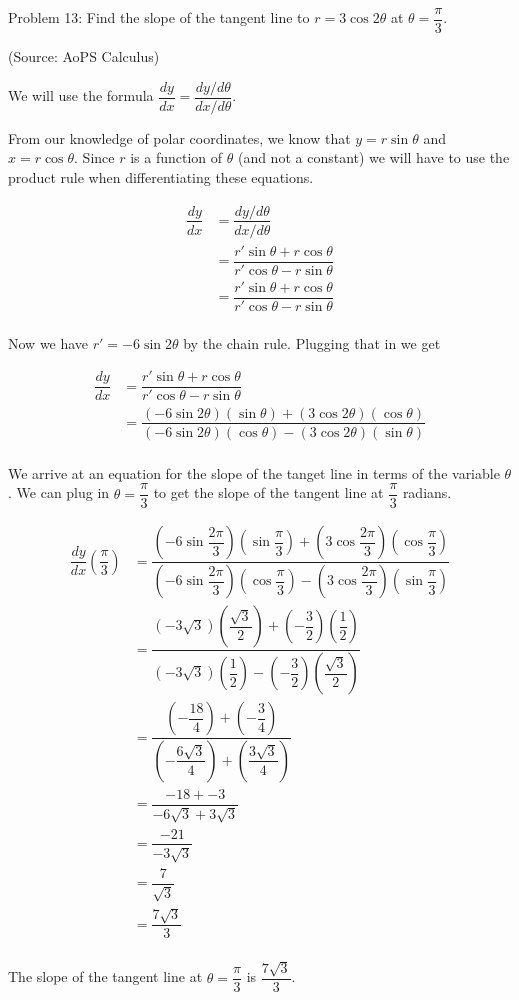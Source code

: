 Problem 13: Find the slope of the tangent line to $r = 3 \cos 2\theta$ at $\theta = \dfrac{\pi}{3}$.

(Source: AoPS Calculus)

We will use the formula $\dfrac{dy}{dx} = \dfrac{dy/d\theta}{dx/d\theta}$.

From our knowledge of polar coordinates, we know that $y = r \sin \theta$ and $x = r \cos \theta$. Since $r$ is a function of $\theta$ (and not a constant) we will have to use the product rule when differentiating these equations.

\begin{align*}
\dfrac{dy}{dx} &= \dfrac{dy/d\theta}{dx/d\theta} \\
&= \dfrac{r' \sin \theta + r \cos \theta}{r' \cos \theta - r \sin \theta} \\
&= \dfrac{r' \sin \theta + r \cos \theta}{r' \cos \theta - r \sin \theta} \\
\end{align*}

Now we have $r' = -6 \sin 2 \theta$ by the chain rule. Plugging that in we get

\begin{align*}
\dfrac{dy}{dx} &= \dfrac{r' \sin \theta + r \cos \theta}{r' \cos \theta - r \sin \theta} \\
&= \dfrac{\left(-6 \sin 2 \theta\right)\left(\sin \theta\right) + \left(3 \cos 2\theta\right)\left(\cos \theta\right)}{\left(-6 \sin 2 \theta\right)\left(\cos \theta\right) - \left(3 \cos 2\theta\right)\left(\sin \theta\right)} \\
\end{align*}

We arrive at an equation for the slope of the tanget line in terms of the variable $\theta$. We can plug in $\theta = \dfrac{\pi}{3}$ to get the slope of the tangent line at $\dfrac{\pi}{3}$ radians.

\begin{align*}
\dfrac{dy}{dx} \left(\dfrac{\pi}{3}\right) &= \dfrac{\left(-6 \sin \dfrac{2\pi}{3}\right)\left(\sin \dfrac{\pi}{3} \right) + \left(3 \cos \dfrac{2\pi}{3}\right)\left(\cos \dfrac{\pi}{3} \right)}{\left(-6 \sin \dfrac{2\pi}{3}\right)\left(\cos \dfrac{\pi}{3}\right) - \left(3 \cos \dfrac{2\pi}{3}\right)\left(\sin \dfrac{\pi}{3}\right)} \\
&= \dfrac{\left( -3 \sqrt3 \right)\left(\dfrac{\sqrt3}{2} \right) + \left( -\dfrac{3}{2}\right)\left(\dfrac{1}{2} \right)}{\left(-3 \sqrt3\right)\left(\dfrac{1}{2}\right) - \left(-\dfrac{3}{2}\right)\left(\dfrac{\sqrt3}{2}\right)} \\
&= \dfrac{\left(-\dfrac{18}{4} \right) + \left( -\dfrac{3}{4}\right)}{\left(-\dfrac{6\sqrt3}{4}\right) + \left(\dfrac{3 \sqrt 3}{4}\right)} \\
&= \dfrac{-18 + -3}{-6\sqrt3 + 3 \sqrt 3} \\
&= \dfrac{-21}{-3\sqrt3} \\
&= \dfrac{7}{\sqrt3} \\
&= \boxed{\dfrac{7 \sqrt 3}{3}} \\
\end{align*}

The slope of the tangent line at $\theta = \dfrac{\pi}{3}$ is $\boxed{\dfrac{7 \sqrt 3}{3}}$.
